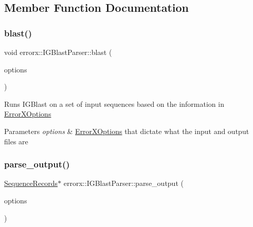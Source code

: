 \subsection{Member Function Documentation}
\mbox{\label{classerrorx_1_1_i_g_blast_parser_a9b252bb6f6bf829104d6caaf96f776f7}} 
\subsubsection{\texorpdfstring{blast()}{blast()}}
{\footnotesize\ttfamily void errorx\+::\+I\+G\+Blast\+Parser\+::blast (\begin{DoxyParamCaption}\item[{\mbox{\hyperlink{classerrorx_1_1_error_x_options}{Error\+X\+Options}} \&}]{options }\end{DoxyParamCaption})}

Runs I\+G\+Blast on a set of input sequences based on the information in \mbox{\hyperlink{classerrorx_1_1_error_x_options}{Error\+X\+Options}}


\begin{DoxyParams}{Parameters}
{\em options} & \mbox{\hyperlink{classerrorx_1_1_error_x_options}{Error\+X\+Options}} that dictate what the input and output files are \\
\hline
\end{DoxyParams}
\mbox{\label{classerrorx_1_1_i_g_blast_parser_ac5d2a9eb14d830258b9462b1b246fa49}} 
\subsubsection{\texorpdfstring{parse\+\_\+output()}{parse\_output()}}
{\footnotesize\ttfamily \mbox{\hyperlink{classerrorx_1_1_sequence_records}{Sequence\+Records}}$\ast$ errorx\+::\+I\+G\+Blast\+Parser\+::parse\+\_\+output (\begin{DoxyParamCaption}\item[{\mbox{\hyperlink{classerrorx_1_1_error_x_options}{Error\+X\+Options}} \&}]{options }\end{DoxyParamCaption})}

